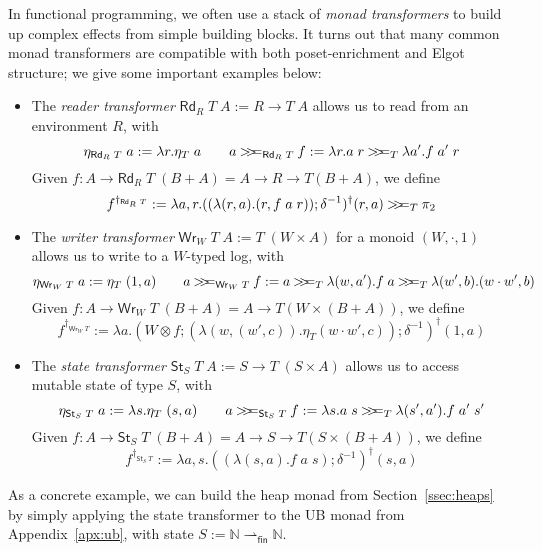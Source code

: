 \documentclass[acmsmall,screen,review]{acmart}
\newcommand{\ms}[1]{\ensuremath{\mathsf{#1}}}
\newcommand{\nats}{\mathbb{N}}
\newcommand{\pto}{\rightharpoonup}
\newcommand{\obind}{\mathbin{>\!\!>\mkern-6.7mu=}}
\newcommand{\mbind}[3]{#2 \obind_{#1} #3}
\begin{document}
In functional programming, we often use a stack of \emph{monad transformers} to build up complex
effects from simple building blocks. It turns out that many common monad transformers are compatible
with both poset-enrichment and Elgot structure; we give some important examples below:
\begin{itemize}
  \item The \emph{reader transformer} $\ms{Rd}_R\;T\;A := R \to T\;A$ allows us to read from an
  environment $R$, with
  \begin{equation*}
  \eta_{\ms{Rd}_R\;T}\;a := \lambda r . \eta_T\;a \qquad
  \mbind{\ms{Rd}_R\;T}{a}{f} := \lambda r. \mbind{T}{a\;r}{\lambda a' . f\;a'\;r}
  \end{equation*}
  Given $f : A \to \ms{Rd}_R\;T\;(B + A) = A \to R \to T(B + A)$, we define
  \begin{equation*}
    f^{\dagger_{\ms{Rd}_R\;T}} := \lambda a, r . 
      \mbind{T}{((\lambda (r, a) . (r, f\;a\;r)) ; \delta^{-1})^\dagger(r, a)}{\pi_2}
  \end{equation*}
  \item The \emph{writer transformer} $\ms{Wr}_W\;T\;A := T\;(W \times A)$ for a monoid $(W, \cdot,
  1)$ allows us to write to a $W$-typed log, with
  \begin{equation*}
  \eta_{\ms{Wr}_W\;T}\;a := \eta_T\;(1, a) \qquad
  \mbind{\ms{Wr}_W\;T}{a}{f} := \mbind{T}{a}{\lambda (w, a') . 
    \mbind{T}{f\;a}{\lambda (w', b) . (w \cdot w', b)}}
  \end{equation*}
  Given $f : A \to \ms{Wr}_W\;T\;(B + A) = A \to T(W \times (B + A))$, we define
  \begin{equation*}
    f^{\dagger_{\ms{Wr}_W\;T}} := \lambda a . 
      (W \otimes f ; (\lambda (w, (w', c)) . \eta_T(w \cdot w', c)) ; \delta^{-1})^\dagger(1, a)
  \end{equation*}
  \item The \emph{state transformer} $\ms{St}_S\;T\;A := S \to T\;(S \times A)$ allows us to access
  mutable state of type $S$, with
  \begin{equation*}
  \eta_{\ms{St}_S\;T}\;a := \lambda s . \eta_T\;(s, a) \qquad
  \mbind{\ms{St}_S\;T}{a}{f} := \lambda s . 
    \mbind{T}{a\;s}{\lambda (s', a') . f\;a'\;s'}
  \end{equation*}
  Given $f : A \to \ms{St}_S\;T\;(B + A) = A \to S \to T(S \times (B + A))$, we define
  \begin{equation*}
    f^{\dagger_{\ms{St}_S\;T}} := \lambda a, s . 
      ((\lambda (s, a) . f\;a\;s) ; \delta^{-1})^\dagger(s, a)
  \end{equation*}
\end{itemize}
As a concrete example, we can build the heap monad from Section~\ref{ssec:heaps} by simply applying
the state transformer to the UB monad from Appendix~\ref{apx:ub}, with state $S := \nats
\pto_{\ms{fin}} \nats$.
\end{document}

